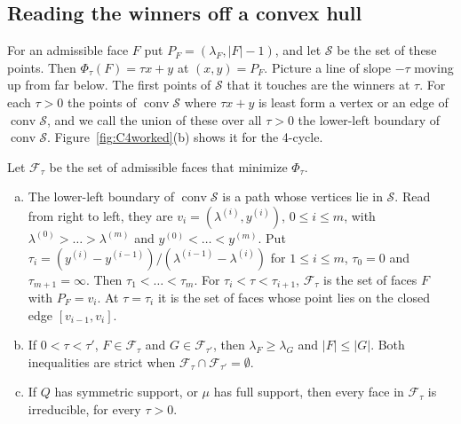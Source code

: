 \subsection{Reading the winners off a convex hull}

For an admissible face $F$ put $P_F=(\lambda_F,\lvert F\rvert-1)$, and let $\mathcal S$
be the set of these points. Then $\Phi_\tau(F)=\tau x+y$ at $(x,y)=P_F$. Picture
a line of slope $-\tau$ moving up from far below. The first points of $\mathcal S$ that
it touches are the winners at $\tau$. For each $\tau>0$ the points of
$\operatorname{conv}\mathcal S$ where $\tau x+y$ is least form a vertex or an edge of
$\operatorname{conv}\mathcal S$, and we call the union of these over all $\tau>0$ the
lower-left boundary of $\operatorname{conv}\mathcal S$. Figure~\ref{fig:C4worked}(b) shows
it for the 4-cycle.

\begin{theorem}\label{thm:hull}
Let $\mathcal F_\tau$ be the set of admissible faces that minimize
$\Phi_\tau$.
\begin{enumerate}[(a)]
\item The lower-left boundary of $\operatorname{conv}\mathcal S$ is a path whose
vertices lie in $\mathcal S$. Read from right to left, they are
$v_i=(\lambda^{(i)},y^{(i)})$, $0\le i\le m$, with
$\lambda^{(0)}>\dots>\lambda^{(m)}$ and $y^{(0)}<\dots<y^{(m)}$. Put
$\tau_i=(y^{(i)}-y^{(i-1)})/(\lambda^{(i-1)}-\lambda^{(i)})$ for $1\le i\le m$,
$\tau_0=0$ and $\tau_{m+1}=\infty$. Then $\tau_1<\dots<\tau_m$. For
$\tau_i<\tau<\tau_{i+1}$, $\mathcal F_\tau$ is the set of faces $F$ with
$P_F=v_i$. At $\tau=\tau_i$ it is the set of faces whose point lies on the
closed edge $[v_{i-1},v_i]$.
\item If $0<\tau<\tau'$, $F\in\mathcal F_\tau$ and $G\in\mathcal F_{\tau'}$,
then $\lambda_F\ge\lambda_G$ and $\lvert F\rvert\le\lvert G\rvert$. Both
inequalities are strict when $\mathcal F_\tau\cap\mathcal F_{\tau'}=\emptyset$.
\item If $Q$ has symmetric support, or $\mu$ has full support, then every face
in $\mathcal F_\tau$ is irreducible, for every $\tau>0$.
\end{enumerate}
\end{theorem}

